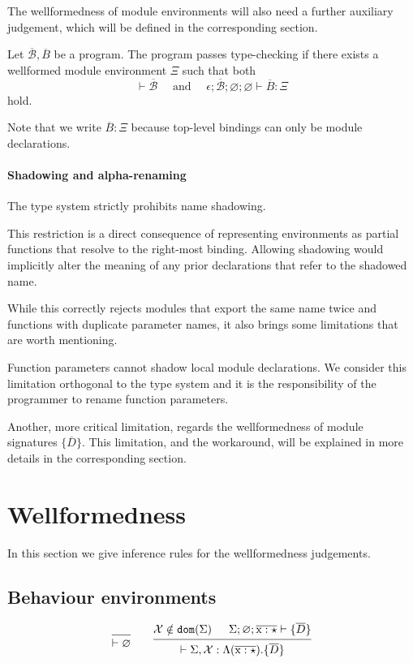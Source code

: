 \documentclass[12pt]{article}
\newcommand{\tx}{\text{\rm x}}
\newcommand{\BX}{\ensuremath{\mathcal{X}}}
\newcommand{\emptyenv}{\varnothing}
\newcommand{\Gammatop}{\ensuremath{\Xi}}
\newcommand{\dom}{\texttt{dom}}
\begin{document}
The wellformedness of module environments will also need a further auxiliary judgement, which will be defined in the corresponding section.

Let $\overline{\mathcal B}, \overline{B}$ be a program. The program passes type-checking if there exists a wellformed module environment $\Gammatop$ such that both
$$\vdash \overline{\mathcal B} \quad \text{ and } \quad \epsilon; \overline{\mathcal{B}}; \emptyenv; \emptyenv \vdash \overline{B} : \Gammatop$$ hold.

Note that we write $\overline{B} : \Gammatop$ because top-level bindings can only be module declarations.

\paragraph{Shadowing and alpha-renaming}

The type system strictly prohibits name shadowing.

This restriction is a direct consequence of representing
environments as partial functions that resolve to the right-most binding. Allowing shadowing would implicitly alter the meaning of any prior declarations that refer to the shadowed name.

While this correctly rejects modules that export the same name twice
and functions with duplicate parameter names,
it also brings some limitations that are worth mentioning.

Function parameters cannot shadow local module declarations.
We consider this limitation orthogonal to the type system and
it is the responsibility of the programmer to rename function parameters.

Another, more critical limitation, regards the wellformedness of
module signatures $\{ \overline{D} \}$. This limitation, and the workaround,
will be explained in more details in the corresponding section.


\section{Wellformedness}

In this section we give inference rules for the wellformedness judgements.

\subsection{Behaviour environments}

\[
    \begin{prooftree}
        \infer0{ \vdash \emptyenv }
    \end{prooftree}
    \qquad
    \begin{prooftree}
        \hypo{ \BX \notin \dom(\Sigma) }
        \hypo{ \Sigma; \emptyenv; \overline{\tx : \star} \vdash \{ \overline{D} \}}
        \infer2{ \vdash \Sigma, \BX : \Lambda (\overline{\tx : \star}).\{\overline{D}\} }
    \end{prooftree}
\]
\end{document}
